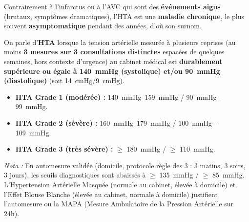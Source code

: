 \documentclass[11pt]{article}
\begin{document}
\noindent Contrairement à l'infarctus ou à l'AVC qui sont des \textbf{événements aigus} (brutaux, symptômes dramatiques), l'HTA est une \textbf{maladie chronique}, le plus souvent \textbf{asymptomatique} pendant des années, d'où son surnom.

\begin{definition}
On parle d'\textbf{HTA} lorsque la tension artérielle mesurée à plusieurs reprises (au moins \textbf{3 mesures sur 3 consultations distinctes} espacées de quelques semaines, hors contexte d'urgence) au cabinet médical est \textbf{durablement supérieure ou égale à \SI{140}{mmHg} (systolique) et/ou \SI{90}{mmHg} (diastolique)} (soit \SI{14}{cmHg}/\SI{9}{cmHg}).
\begin{itemize}
    \item \textbf{HTA Grade 1 (modérée) :} \SIrange{140}{159}{mmHg} / \SIrange{90}{99}{mmHg}.
    \item \textbf{HTA Grade 2 (sévère) :} \SIrange{160}{179}{mmHg} / \SIrange{100}{109}{mmHg}.
    \item \textbf{HTA Grade 3 (très sévère) :} $\ge$ \SI{180}{mmHg} / $\ge$ \SI{110}{mmHg}.
\end{itemize}
\emph{Nota :} En automesure validée (domicile, protocole règle des 3 : 3 matins, 3 soirs, 3 jours), les seuils diagnostiques sont abaissés à $\ge$ \SI{135}{mmHg} / $\ge$ \SI{85}{mmHg}. L'Hypertension Artérielle Masquée (normale au cabinet, élevée à domicile) et l'Effet Blouse Blanche (élevée au cabinet, normale à domicile) justifient l'automesure ou la MAPA (Mesure Ambulatoire de la Pression Artérielle sur 24h).
\end{definition}
\end{document}

